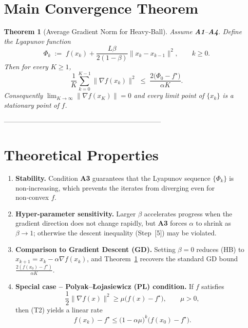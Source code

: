 \documentclass{article}
\newtheorem{theorem}{Theorem}
\begin{document}
\section*{Main Convergence Theorem}

\begin{theorem}[Average Gradient Norm for Heavy‑Ball]\label{thm:hb}
Assume \textbf{A1}–\textbf{A4}.  Define the Lyapunov function
\[
\Phi_{k}\;:=\;f(x_{k})+\frac{L\beta}{2(1-\beta)}\|x_{k}-x_{k-1}\|^{2},\qquad k\ge0.
\tag{T1}
\]
Then for every $K\ge1$,
\[
\frac{1}{K}\sum_{k=0}^{K-1}\|\nabla f(x_{k})\|^{2}
\;\le\;
\frac{2\bigl(\Phi_{0}-f^{\star}\bigr)}{\alpha K}.
\tag{T2}
\]
Consequently $\displaystyle\lim_{K\to\infty}\|\nabla f(x_{K})\|=0$ and every limit point of $\{x_{k}\}$ is a stationary point of $f$.
\end{theorem}

---------------------------------------------------------------------

\section*{Theoretical Properties}

\begin{enumerate}[label={\bf P\arabic*}.]
\item \textbf{Stability.} Condition \textbf{A3} guarantees that the Lyapunov sequence
$\{\Phi_{k}\}$ is non‑increasing, which prevents the iterates from diverging even for non‑convex $f$.

\item \textbf{Hyper‑parameter sensitivity.} Larger $\beta$ accelerates progress when the
gradient direction does not change rapidly, but \textbf{A3} forces $\alpha$ to shrink as $\beta\to1$; otherwise the descent inequality (Step~[5]) may be violated.

\item \textbf{Comparison to Gradient Descent (GD).} Setting $\beta=0$ reduces (HB) to
$x_{k+1}=x_{k}-\alpha\nabla f(x_{k})$, and Theorem~\ref{thm:hb} recovers the standard GD bound
$\frac{2(f(x_{0})-f^{\star})}{\alpha K}$.

\item \textbf{Special case – Polyak–Łojasiewicz (PL) condition.} If $f$ satisfies
\[
\frac{1}{2}\|\nabla f(x)\|^{2}\ge\mu\bigl(f(x)-f^{\star}\bigr),\qquad\mu>0,
\tag{P4}
\]
then (T2) yields a linear rate
\[
f(x_{k})-f^{\star}\le\bigl(1-\alpha\mu\bigr)^{k}\bigl(f(x_{0})-f^{\star}\bigr).
\]
\end{enumerate}
\end{document}
